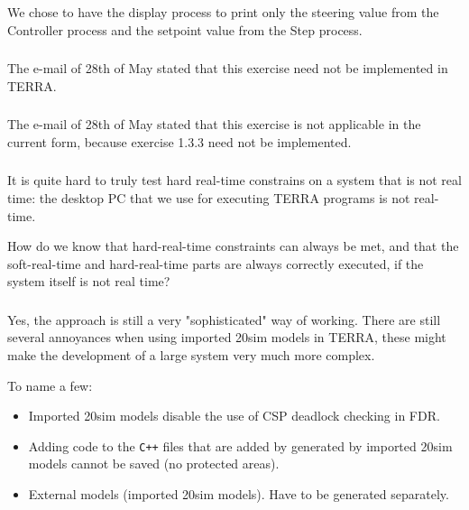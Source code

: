 \documentclass[a4paper,twoside,11pt]{article}
\newcommand{\cpp}{{\tt C++} }
\begin{document}
We chose to have the display process to print only the steering value from the Controller
process and the setpoint value from the Step process.

\subsubsection{}
The e-mail of 28th of May stated that this exercise need not be implemented in TERRA.
\subsubsection{}
The e-mail of 28th of May stated that this exercise is not applicable in the 
current form, because exercise 1.3.3 need not be implemented.

\subsubsection{}
It is quite hard to truly test hard real-time constrains on a system that is not 
real time: the desktop PC that we use for executing TERRA programs is not real-time.

How do we know that hard-real-time constraints can always be met, and that the
soft-real-time and hard-real-time parts are always correctly executed, if the system itself is not real time? 

\subsubsection{}
Yes, the approach is still a very "sophisticated" way of working.
There are still several annoyances when using imported 20sim models in TERRA,
these might make the development of a large system very much more complex.

To name a few:
\begin{itemize}
	\item Imported 20sim models disable the use of CSP deadlock checking in FDR.
	\item Adding code to the \cpp files that are added by generated by imported 20sim 
		models cannot be saved (no protected areas).
	\item External models (imported 20sim models). Have to be generated separately.
\end{itemize}
\end{document}
